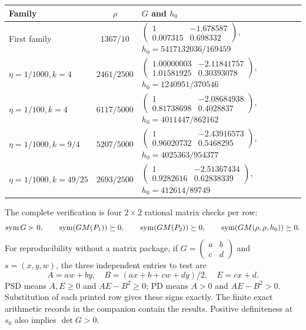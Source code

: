 \begin{center}\small
\begin{tabular}{@{}lcl@{}}\toprule
 Family & $\rho$ & $G$ and $h_0$\\\midrule
 First family & $1367/10$ &
 $\begin{pmatrix}1&-1.678587\\0.007315&0.698332\end{pmatrix}$,
 $h_0=5417132036/169459$\\[6pt]
 $\eta=1/1000,k=4$ & $2461/2500$ &
 $\begin{pmatrix}1.00000003&-2.11841757\\1.01581925&0.30393078\end{pmatrix}$,
 $h_0=1240951/370546$\\[6pt]
 $\eta=1/100,k=4$ & $6117/5000$ &
 $\begin{pmatrix}1&-2.08684938\\0.81738698&0.4028837\end{pmatrix}$,
 $h_0=4011447/862162$\\[6pt]
 $\eta=1/1000,k=9/4$ & $5207/5000$ &
 $\begin{pmatrix}1&-2.43916573\\0.96020732&0.5468295\end{pmatrix}$,
 $h_0=4025363/954377$\\[6pt]
 $\eta=1/1000,k=49/25$ & $2693/2500$ &
 $\begin{pmatrix}1&-2.51367434\\0.9282616&0.62838339\end{pmatrix}$,
 $h_0=412614/89749$\\\bottomrule
\end{tabular}
\end{center}
The complete verification is four $2\times2$ rational matrix checks per row:
\begin{equation}\label{dp:witness-checks}
 \operatorname{sym} G\succ0,\qquad
 \operatorname{sym}(GM(P_1))\succeq0,\qquad
 \operatorname{sym}(GM(P_2))\succeq0,\qquad
 \operatorname{sym}(GM(\rho,\rho,h_0))\succeq0.
\end{equation}
For reproducibility without a matrix package, if
$G=\left(\begin{smallmatrix}a&b\\c&d\end{smallmatrix}\right)$ and
$s=(x,y,w)$, the three independent entries to test are
\[
 A=aw+by,\quad B=(ax+b+cw+dy)/2,\quad E=cx+d.
\]
PSD means $A,E\ge0$ and $AE-B^2\ge0$; PD means $A>0$ and
$AE-B^2>0$. Substitution of each printed row gives these signs exactly.
The finite exact arithmetic records in the companion contain the results.
Positive definiteness at $s_0$ also implies $\det G>0$.

